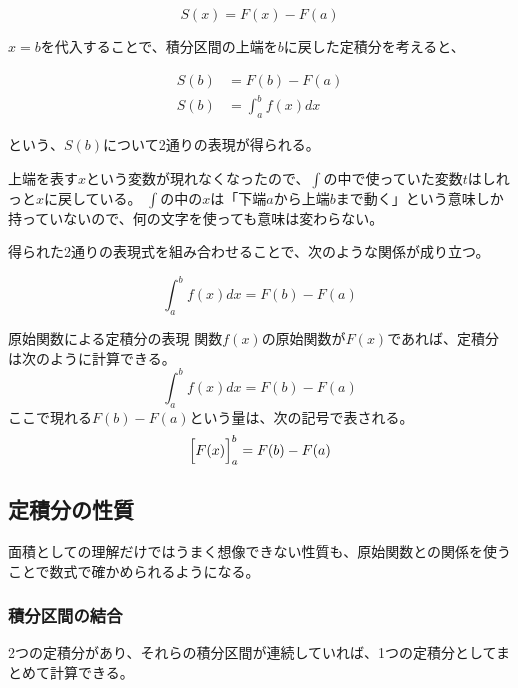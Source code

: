 \documentclass[../../imaging-math]{subfiles}
\begin{document}
\begin{equation}
  S(x) = F(x) - F(a)
\end{equation}

$x=b$を代入することで、積分区間の上端を$b$に戻した定積分を考えると、

\begin{align}
  S(b) & = F(b) - F(a)        \\
  S(b) & = \int_{a}^{b}f(x)dx
\end{align}

という、$S(b)$について2通りの表現が得られる。

\begin{supplnote}
  上端を表す$x$という変数が現れなくなったので、$\int$の中で使っていた変数$t$はしれっと$x$に戻している。
  $\int$の中の$x$は「下端$a$から上端$b$まで動く」という意味しか持っていないので、何の文字を使っても意味は変わらない。
\end{supplnote}

得られた2通りの表現式を組み合わせることで、次のような関係が成り立つ。

\begin{equation}
  \int_{a}^{b}f(x)dx = F(b) - F(a)
\end{equation}

\begin{theorem}{原始関数による定積分の表現}
  \titlegap
  関数$f(x)$の原始関数が$F(x)$であれば、定積分は次のように計算できる。
  \LARGE
  \begin{equation}
    \int_{a}^{b}f(x)dx = F(b) - F(a)
  \end{equation}
  \normalsize
  ここで現れる$F(b) - F(a)$という量は、次の記号で表される。
  \LARGE
  \begin{equation}
    \Bigl[ F(x) \Bigr]_{a}^{b} = F(b) - F(a)
  \end{equation}
\end{theorem}

\subsection{定積分の性質}

面積としての理解だけではうまく想像できない性質も、原始関数との関係を使うことで数式で確かめられるようになる。

\subsubsection{積分区間の結合}

2つの定積分があり、それらの積分区間が連続していれば、1つの定積分としてまとめて計算できる。
\end{document}
